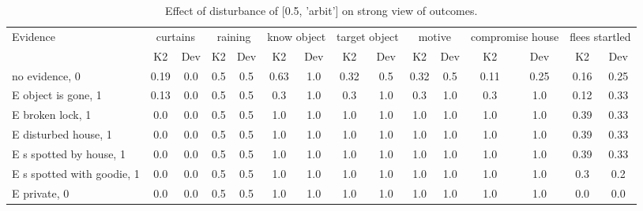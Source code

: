 \begin{table}\begin{tabular}{l|cc|cc|cc|cc|cc|cc|cc}\toprule\multirow{2}{*}{Evidence} & \multicolumn{2}{c}{curtains}& \multicolumn{2}{c}{raining}& \multicolumn{2}{c}{know object}& \multicolumn{2}{c}{target object}& \multicolumn{2}{c}{motive}& \multicolumn{2}{c}{compromise house}& \multicolumn{2}{c}{flees startled}\\& {K2} & {Dev}& {K2} & {Dev}& {K2} & {Dev}& {K2} & {Dev}& {K2} & {Dev}& {K2} & {Dev}& {K2} & {Dev}\\\midrule
no evidence, 0 & \cellcolor{Bittersweet}0.19&\cellcolor{Bittersweet}0.0&0.5&0.5&\cellcolor{Bittersweet}0.63&\cellcolor{Bittersweet}1.0&\cellcolor{Bittersweet}0.32&\cellcolor{Bittersweet}0.5&\cellcolor{Bittersweet}0.32&\cellcolor{Bittersweet}0.5&\cellcolor{Bittersweet}0.11&\cellcolor{Bittersweet}0.25&\cellcolor{Bittersweet}0.16&\cellcolor{Bittersweet}0.25\\E object is gone, 1 & \cellcolor{Bittersweet}0.13&\cellcolor{Bittersweet}0.0&0.5&0.5&\cellcolor{Bittersweet}0.3&\cellcolor{Bittersweet}1.0&\cellcolor{Bittersweet}0.3&\cellcolor{Bittersweet}1.0&\cellcolor{Bittersweet}0.3&\cellcolor{Bittersweet}1.0&\cellcolor{Bittersweet}0.3&\cellcolor{Bittersweet}1.0&\cellcolor{Bittersweet}0.12&\cellcolor{Bittersweet}0.33\\E broken lock, 1 & 0.0&0.0&0.5&0.5&1.0&1.0&1.0&1.0&1.0&1.0&1.0&1.0&\cellcolor{Bittersweet}0.39&\cellcolor{Bittersweet}0.33\\E disturbed house, 1 & 0.0&0.0&0.5&0.5&1.0&1.0&1.0&1.0&1.0&1.0&1.0&1.0&\cellcolor{Bittersweet}0.39&\cellcolor{Bittersweet}0.33\\E s spotted by house, 1 & 0.0&0.0&0.5&0.5&1.0&1.0&1.0&1.0&1.0&1.0&1.0&1.0&\cellcolor{Bittersweet}0.39&\cellcolor{Bittersweet}0.33\\E s spotted with goodie, 1 & 0.0&0.0&0.5&0.5&1.0&1.0&1.0&1.0&1.0&1.0&1.0&1.0&\cellcolor{Bittersweet}0.3&\cellcolor{Bittersweet}0.2\\E private, 0 & 0.0&0.0&0.5&0.5&1.0&1.0&1.0&1.0&1.0&1.0&1.0&1.0&0.0&0.0\\\bottomrule\end{tabular}\caption{Effect of disturbance of [0.5, 'arbit'] on strong view of outcomes.}\end{table}